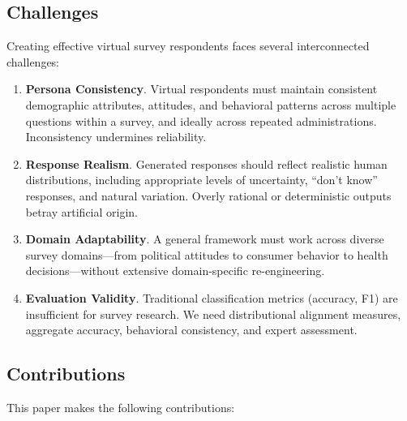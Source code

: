 \documentclass[sigconf,nonarchival]{acmart}
\begin{document}
\subsection{Challenges}

Creating effective virtual survey respondents faces several interconnected challenges:

\begin{enumerate}
\item \textbf{Persona Consistency}. Virtual respondents must maintain consistent demographic attributes, attitudes, and behavioral patterns across multiple questions within a survey, and ideally across repeated administrations. Inconsistency undermines reliability.

\item \textbf{Response Realism}. Generated responses should reflect realistic human distributions, including appropriate levels of uncertainty, ``don't know'' responses, and natural variation. Overly rational or deterministic outputs betray artificial origin.

\item \textbf{Domain Adaptability}. A general framework must work across diverse survey domains—from political attitudes to consumer behavior to health decisions—without extensive domain-specific re-engineering.

\item \textbf{Evaluation Validity}. Traditional classification metrics (accuracy, F1) are insufficient for survey research. We need distributional alignment measures, aggregate accuracy, behavioral consistency, and expert assessment.
\end{enumerate}

\subsection{Contributions}

This paper makes the following contributions:
\end{document}
